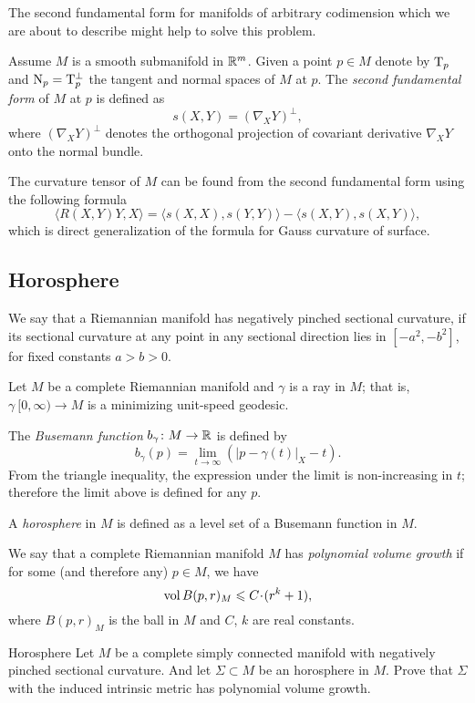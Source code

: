 The second fundamental form for manifolds of arbitrary codimension
which we are about to describe 
might help to solve this problem.

Assume $M$ is a smooth submanifold in $\mathbb{R}^m$.
Given a point $p\in M$ denote by $\mathrm{T}_p$ and $\mathrm{N}_p=\mathrm{T}_p^\bot$
the tangent and normal spaces of $M$ at $p$.
The \emph{second fundamental form} of $M$ at $p$ is defined as $$s(X,Y)=(\nabla_X Y)^\bot,$$ 
where $(\nabla_X Y)^\bot$ denotes the orthogonal projection of covariant derivative $\nabla_X Y$ onto the normal bundle.

The curvature tensor of $M$ can be found from the second fundamental form using the following  formula
\[\langle R(X,Y)Y,X\rangle=\langle s(X,X),s(Y,Y)\rangle-\langle s(X,Y),s(X,Y)\rangle,\]
which is direct generalization of the formula for Gauss curvature of surface.


\subsection*{Horosphere}

We say that a Riemannian manifold has negatively pinched sectional curvature, if its sectional curvature at any point in any sectional direction lies in  $[-a^2, -b^2]$, for fixed constants $a>b>0$.

Let $M$ be a complete Riemannian manifold
and $\gamma$ is a ray in $M$; 
that is, $\gamma\:[0, \infty)\to M$ is a minimizing unit-speed geodesic.

The \emph{Busemann function} $b_\gamma\colon M\to\mathbb{R}$ is defined by
$$b_\gamma(p)=\lim_{t\to\infty}\left(|p-\gamma(t)|_X-t\right).$$
From the triangle inequality, 
the expression under the limit is non-increasing in $t$; 
therefore  the limit above is defined for any $p$.

A \emph{horosphere} in $M$ is defined as a level set of a Busemann function
in $M$.

We say that a complete Riemannian manifold $M$ has \emph{polynomial volume growth} if for some (and therefore any) $p\in M$, 
we have 
$$\vol B(p,r)_M\z\le C\cdot (r^k+1),$$ 
where $B(p,r)_M$ is the ball in $M$ and  $C$, $k$ are real constants.

\begin{pr}{}{Horosphere}\label{Horosphere} Let $M$ be a complete simply connected manifold with negatively pin\-ched sectional curvature. 
And let $\Sigma\subset M$ be an horosphere in $M$.
 Prove that
$\Sigma$ with the induced intrinsic metric 
has polynomial volume growth.
\end{pr}


